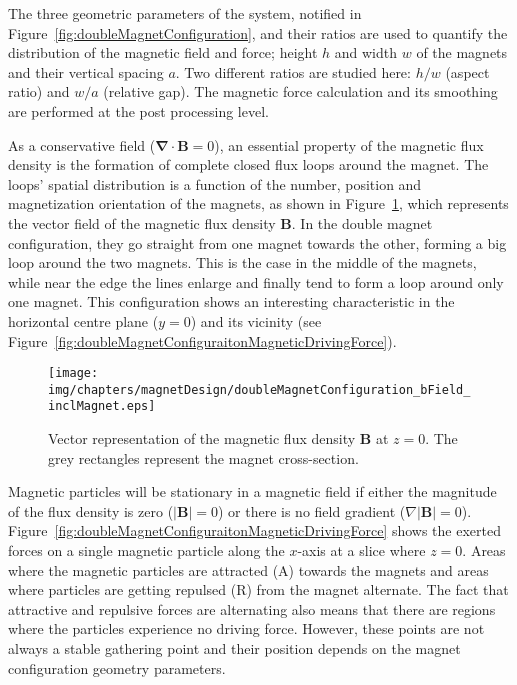 The three geometric parameters of the system, notified in Figure~\ref{fig:doubleMagnetConfiguration}, and their ratios are used to quantify the distribution of the magnetic field and force; height $h$ and width $w$ of the magnets and their vertical spacing $a$. Two different ratios are studied here: $h/w$ (aspect ratio) and $w/a$ (relative gap). The magnetic force calculation and its smoothing are performed at the post processing level.

As a conservative field ($\mathbf{\nabla} \cdot \mathbf{B} = 0$), an essential property of the magnetic flux density is the formation of complete closed flux loops around the magnet. The loops' spatial distribution is a function of the number, position and magnetization orientation of the magnets, as shown in Figure~\ref{fig:magneticFluxDensityDoubleMagnetConfiguration}, which represents the vector field of the magnetic flux density $\mathbf{B}$. In the double magnet configuration, they go straight from one magnet towards the other, forming a big loop around the two magnets. This is the case in the middle of the magnets, while near the edge the lines enlarge and finally tend to form a loop around only one magnet. This configuration shows an interesting characteristic in the horizontal centre plane ($y=0$) and its vicinity (see Figure~\ref{fig:doubleMagnetConfiguraitonMagneticDrivingForce}). 

\begin{figure}[htb]
   \centering
   \texttt{[image: img/chapters/magnetDesign/doubleMagnetConfiguration\_bField\_inclMagnet.eps]}
   \caption[Simulated vector field of the magnetic flux of the double magnet configuration]{Vector representation of the magnetic flux density $\mathbf{B}$ at $z=0$. The grey rectangles represent the magnet cross-section.}
   \label{fig:magneticFluxDensityDoubleMagnetConfiguration}
\end{figure}

Magnetic particles will be stationary in a magnetic field if either the magnitude of the flux density is zero ($|\mathbf{B}|=0$) or there is no field gradient ($\nabla|\mathbf{B}|=0$). Figure~\ref{fig:doubleMagnetConfiguraitonMagneticDrivingForce} shows the exerted forces on a single magnetic particle along the $x$-axis at a slice where $z=0$. Areas where the magnetic particles are attracted (A) towards the magnets and areas where particles are getting repulsed (R) from the magnet alternate. The fact that attractive and repulsive forces are alternating also means that there are regions where the particles experience no driving force. However, these points are not always a stable gathering point and their position depends on the magnet configuration geometry parameters. 

